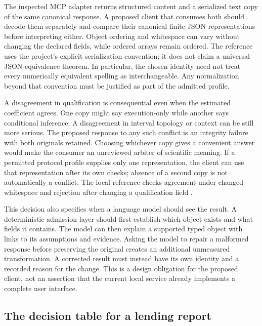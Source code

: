 The inspected MCP adapter returns structured content and a serialized text
copy of the same canonical response. A proposed client that consumes both
should decode them separately and compare their canonical finite JSON
representations before interpreting either. Object ordering and whitespace
can vary without changing the declared fields, while ordered arrays remain
ordered. The reference uses the project's explicit serialization convention;
it does not claim a universal JSON-equivalence theorem. In particular, the
chosen identity need not treat every numerically equivalent spelling as
interchangeable. Any normalization beyond that convention must be justified
as part of the admitted profile.

A disagreement in qualification is consequential even when the estimated
coefficient agrees. One copy might say execution-only while another says
conditional inference. A disagreement in interval topology or context can
be still more serious. The proposed response to any such conflict is an
integrity failure with both originals retained. Choosing whichever copy gives
a convenient answer would make the consumer an unreviewed arbiter of
scientific meaning. If a permitted protocol profile supplies only one
representation, the client can use that representation after its own checks;
absence of a second copy is not automatically a conflict. The local reference
checks agreement under changed whitespace and rejection after changing a
qualification field \citep{exec17_integration_review_reference}.

This decision also specifies when a language model should see the result.
A deterministic admission layer should first establish which object exists
and what fields it contains. The model can then explain a supported typed
object with links to its assumptions and evidence. Asking the model to repair
a malformed response before preserving the original creates an additional
unmeasured transformation. A corrected result must instead have its own
identity and a recorded reason for the change. This is a design obligation
for the proposed client, not an assertion that the current local service
already implements a complete user interface.

\subsection{The decision table for a lending report}

